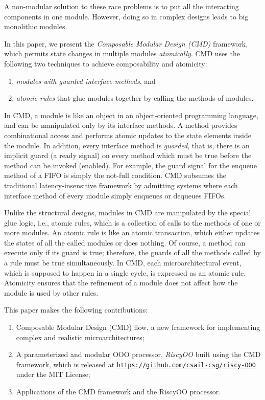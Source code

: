 \documentclass[conference]{IEEEtran}
\begin{document}
A non-modular solution to these race problems is to put all the interacting components in one module.
However, doing so in complex designs leads to big monolithic modules.

In this paper, we present the \emph{Composable Modular Design (CMD)} framework, which permits state changes in multiple modules \emph{atomically}.
CMD uses the following two techniques to achieve composability and atomicity:
\begin{enumerate}
    \item \emph{modules with guarded interface methods}, and
    \item \emph{atomic rules} that glue modules together by calling the methods of modules.
\end{enumerate}

In CMD, a module is like an object in an object-oriented programming language, and can be manipulated only by its interface methods.
A method provides combinational access and performs atomic updates to the state elements inside the module.
In addition, every interface method is \emph{guarded}, that is, there is an implicit guard (a ready signal) on every method which must be true before the method can be invoked (enabled).
For example, the guard signal for the enqueue method of a FIFO is simply the not-full condition.
CMD subsumes the traditional latency-insensitive framework by admitting systems where each interface method of every module simply enqueues or dequeues FIFOs.

Unlike the structural designs, modules in CMD are manipulated by the special glue logic, i.e., atomic rules, which is a collection of calls to the methods of one or more modules.
An atomic rule is like an atomic transaction, which either updates the states of all the called modules  or does nothing.
Of course, a method can execute only if its guard is true; therefore, the guards of all the methods called by a rule must be true simultaneously.
In CMD, each microarchitectural event, which is supposed to happen in a single cycle, is expressed as an atomic rule.
Atomicity ensures that the refinement of a module does not affect how the module is used by other rules.

This paper makes the following contributions:
\begin{enumerate}
    \item Composable Modular Design (CMD) flow, a new framework for implementing complex and realistic microarchitectures;
    
    \item A parameterized and modular OOO processor, \emph{RiscyOO} built using the CMD framework, which is released at \texttt{\url{https://github.com/csail-csg/riscy-OOO}} under the MIT License;
    
    \item Applications of the CMD framework and the RiscyOO processor.
\end{enumerate}
\end{document}
